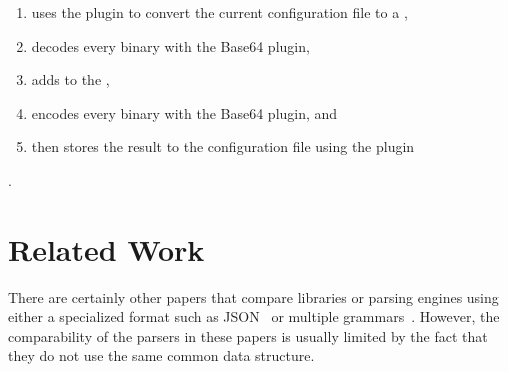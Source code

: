 \begin{enumerate}
  \item uses the  plugin to convert the current  configuration file to a ,
  \item decodes every binary  with the Base64 plugin,
  \item adds  to the ,
  \item encodes every binary  with the Base64 plugin, and
  \item then stores the result to the configuration file using the  plugin
\end{enumerate}

.

\section{Related Work}

There are certainly other papers that compare libraries or parsing engines using either a specialized format such as JSON~\cite{json2019geoff} or multiple grammars~\cite{chen2011full, flodin2014packrat}. However, the comparability of the parsers in these papers is usually limited by the fact that they do not use the same common data structure.
